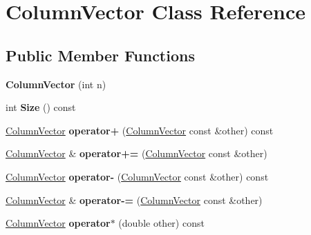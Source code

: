 \hypertarget{classColumnVector}{}\section{Column\+Vector Class Reference}
\label{classColumnVector}
\subsection*{Public Member Functions}
\begin{DoxyCompactItemize}
\item 
\mbox{\label{classColumnVector_a04c6fb8d73a6a1e816246114487af21e}} 
{\bfseries Column\+Vector} (int n)
\item 
\mbox{\label{classColumnVector_ace00809de2f40bc40760759915424606}} 
int {\bfseries Size} () const
\item 
\mbox{\label{classColumnVector_a71aef8eb58f6abf7142aa064ea4b2b67}} 
\hyperlink{classColumnVector}{Column\+Vector} {\bfseries operator+} (\hyperlink{classColumnVector}{Column\+Vector} const \&other) const
\item 
\mbox{\label{classColumnVector_a9a97a16318637c348473c2ef010772e0}} 
\hyperlink{classColumnVector}{Column\+Vector} \& {\bfseries operator+=} (\hyperlink{classColumnVector}{Column\+Vector} const \&other)
\item 
\mbox{\label{classColumnVector_a2955856b4cf0c90840e927192007b717}} 
\hyperlink{classColumnVector}{Column\+Vector} {\bfseries operator-\/} (\hyperlink{classColumnVector}{Column\+Vector} const \&other) const
\item 
\mbox{\label{classColumnVector_a2eabe166745011663d3f02454d04b526}} 
\hyperlink{classColumnVector}{Column\+Vector} \& {\bfseries operator-\/=} (\hyperlink{classColumnVector}{Column\+Vector} const \&other)
\item 
\mbox{\label{classColumnVector_a48b64ae9de4f9feff9712093d5baf3c4}} 
\hyperlink{classColumnVector}{Column\+Vector} {\bfseries operator$\ast$} (double other) const
\item 
\mbox{\label{classColumnVector_a9cac6c2fb1c1adcc8aec577e9fa43981}} 

\end{DoxyCompactItemize}
